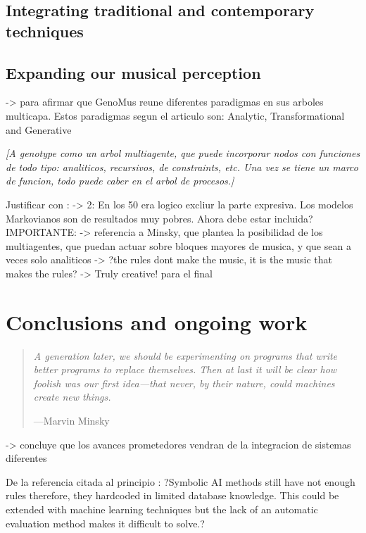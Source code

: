 \documentclass{article}
\begin{document}
\subsection{Integrating traditional and contemporary techniques}

\subsection{Expanding our musical perception}


{\color{red}

\cite{quteprints6544} -> para afirmar que GenoMus reune diferentes paradigmas en sus arboles multicapa. Estos paradigmas segun el articulo son: Analytic, Transformational and Generative
}

{\color{gray} \textsl{[A genotype como un arbol multiagente, que puede incorporar nodos con funciones de todo tipo: analiticos, recursivos, de constraints, etc. Una vez se tiene un marco de funcion, todo puede caber en el arbol de procesos.]}}


{\color{red}

Justificar con \cite{LopezdeMantaras:2006:MMA:1565082.1565089}:
	-> 2: En los 50 era logico excliur la parte expresiva. Los modelos Markovianos son de resultados muy pobres. Ahora debe estar incluida?
IMPORTANTE:
	-> referencia a Minsky, que plantea la posibilidad de los multiagentes, que puedan actuar sobre bloques mayores de musica, y que sean a veces solo analiticos
	-> ?the rules dont make the music, it is the music that makes the rules?
	-> Truly creative! para el final
}


\section{Conclusions and ongoing work}

\begin{samepage}
\begin{quotation}
\textsl{A generation later, we should be experimenting on programs
that write better programs to replace themselves. Then
at last it will be clear how foolish was our first idea---that
never, by their nature, could machines create new things.}

---Marvin Minsky \cite{DBLP:journals/aim/Minsky82}
\end{quotation}
\end{samepage}

{\color{red}

\cite{Papadopoulos99aimethods} -> concluye que los avances prometedores vendran de la integracion de sistemas diferentes

De la referencia citada al principio \cite{LopezRincon2018}: ?Symbolic AI methods still have not enough rules therefore,
they hardcoded in limited database knowledge. This could be
extended with machine learning techniques but the lack of an
automatic evaluation method makes it difficult to solve.?

}
\end{document}
